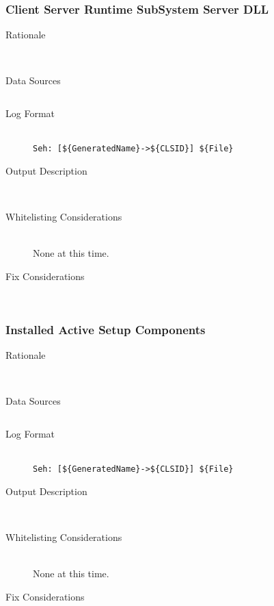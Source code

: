 \subsubsection{Client Server Runtime SubSystem Server DLL}
\begin{description}
\item[Rationale] \hfill \\

\item[Data Sources] \hfill
\vspace{-\baselineskip}
\begin{verbatim}

\end{verbatim}
\item[Log Format] \hfill \\
\verb|Seh: [${GeneratedName}->${CLSID}] ${File}|
\item[Output Description] \hfill \\

\item[Whitelisting Considerations] \hfill \\
None at this time.
\item[Fix Considerations] \hfill \\
\end{description}

\subsubsection{Installed Active Setup Components}
\begin{description}
\item[Rationale] \hfill \\

\item[Data Sources] \hfill
\vspace{-\baselineskip}
\begin{verbatim}

\end{verbatim}
\item[Log Format] \hfill \\
\verb|Seh: [${GeneratedName}->${CLSID}] ${File}|
\item[Output Description] \hfill \\

\item[Whitelisting Considerations] \hfill \\
None at this time.
\item[Fix Considerations] \hfill \\
\end{description}

